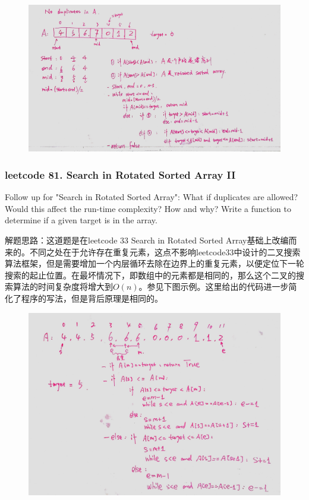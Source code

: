 \documentclass[a4paper,10pt]{article}
\begin{document}
\begin{figure}[h]
    \includegraphics[width=\textwidth]{leetcode33.jpg}
    \centering \\
\end{figure}




\subsubsection{leetcode 81. Search in Rotated Sorted Array II}
Follow up for "Search in Rotated Sorted Array":
What if duplicates are allowed? Would this affect the run-time complexity? How and why? Write a function to determine if a given target is in the array.\\

\begin{CJK*}{UTF8}{gbsn}
\noindent 解题思路：这道题是在leetcode 33 Search in Rotated Sorted Array基础上改编而来的。不同之处在于允许存在重复元素，这点不影响leetcode33中设计的二叉搜索算法框架，但是需要增加一个内层循环去除在边界上的重复元素，以便定位下一轮搜索的起止位置。在最坏情况下，即数组中的元素都是相同的，那么这个二叉的搜索算法的时间复杂度将增大到$O(n)$。参见下图示例。这里给出的代码进一步简化了程序的写法，但是背后原理是相同的。
\end{CJK*}

\begin{figure}[h]
    \includegraphics[width=\textwidth]{leetcode81.jpg}
    \centering
\end{figure}
\end{document}
